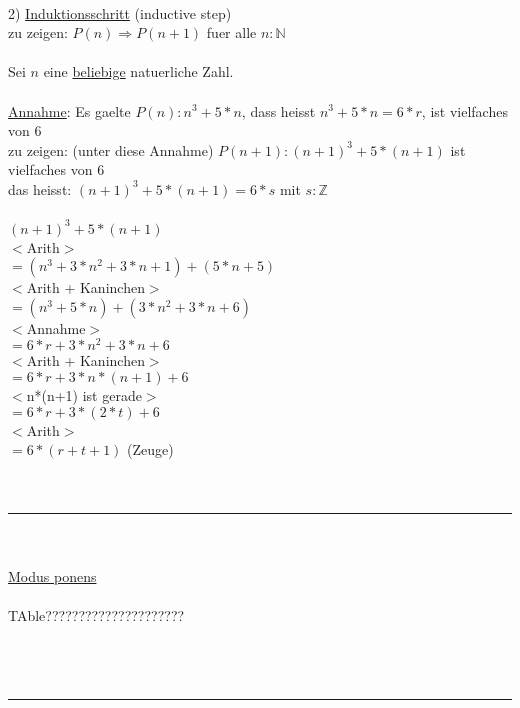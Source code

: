 \documentclass[18pt,a4paper]{article}
\newcommand{\tab}{\hspace*{2em}}
\begin{document}
\\
2) \uline{Induktionsschritt} (inductive step)\\
zu zeigen: $P(n) \Rightarrow P(n+1)$ fuer alle $n:\mathbb{N}$\\
\\
Sei $n$ eine \uline{beliebige} natuerliche Zahl.\\
\\
\uline{Annahme}: Es gaelte $P(n) : n^3 + 5 * n$, dass heisst $n^3 + 5 * n = 6 * r$, ist vielfaches von $6$\\
zu zeigen: (unter diese Annahme) $P(n+1): (n+1)^3 + 5 * (n+1)$ ist vielfaches von $6$\\
das heisst: $(n+1)^3 + 5 * (n+1) = 6 * s$ mit $s: \mathbb{Z}$\\
\\
$(n+1)^3 + 5 * (n+1)$\\
\tab $<$Arith$>$ \\
$= (n^3 + 3*n^2 + 3*n +1) + (5*n + 5)$\\
\tab $<$Arith + Kaninchen$>$ \\
$= (n^3 + 5*n) + (3*n^2 + 3*n + 6)$\\
\tab $<$Annahme$>$\\
$= 6*r + 3*n^2 + 3*n + 6$\\
\tab $<$Arith + Kaninchen$>$\\
$= 6*r + 3*n*(n+1) + 6$\\
\tab $<$n*(n+1) ist gerade$>$\\
$= 6*r + 3*(2*t) + 6$\\
\tab $<$Arith$>$\\
$= 6*(r+t+1)$ (Zeuge) \checkmark \\
\\
\\
\rule{\textwidth}{0.4mm}\\
\\
\uline{Modus ponens}\\
\\
TAble?????????????????????\\
\\
\\
\\
\rule{\textwidth}{0.4mm}\\
\\










%
%
\end{document}
